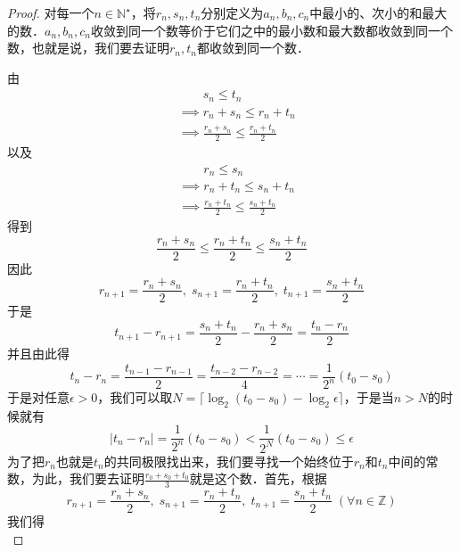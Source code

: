 \documentclass{ctexart}
\theoremstyle{definition}
\theoremstyle{definition}
\theoremstyle{plain}
\theoremstyle{plain}
\theoremstyle{plain}
\theoremstyle{definition}
\newcommand{\nat}{\mathbb{N}^\star}
\newcommand{\integer}{\mathbb{Z}}
\begin{document}
\begin{proof}
    对每一个$n \in \nat$，将$r_n,s_n,t_n$分别定义为$a_n,b_n,c_n$中最小的、次小的和最大的数．$a_n,b_n,c_n$收敛到同一个数等价于它们之中的最小数和最大数都收敛到同一个数，也就是说，我们要去证明$r_n,t_n$都收敛到同一个数．

\noindent 由
\begin{align}
    &\mathrel{\phantom{\implies}} s_n \leq t_n \\
    &\implies r_n + s_n \leq r_n + t_n \\
    &\implies \frac{r_n+s_n}{2} \leq \frac{r_n+t_n}{2} 
\end{align}
以及
\begin{align}
    &\mathrel{\phantom{\implies}} r_n \leq s_n \\
    &\implies r_n + t_n \leq s_n + t_n \\
    &\implies \frac{r_n+t_n}{2} \leq \frac{s_n+t_n}{2}
\end{align}
得到
\begin{equation}
    \frac{r_n+s_n}{2} \leq \frac{r_n+t_n}{2} \leq \frac{s_n+t_n}{2}
\end{equation}
因此
\begin{equation}
    r_{n+1} = \frac{r_n+s_n}{2}, \; s_{n+1} = \frac{r_n+t_n}{2}, \; t_{n+1}=\frac{s_n+t_n}{2}
\end{equation}
于是
\begin{equation}
    t_{n+1} - r_{n+1} = \frac{s_n+t_n}{2} - \frac{r_n+s_n}{2} = \frac{t_n - r_n}{2}
\end{equation}
\noindent 并且由此得
\begin{equation}
t_n - r_n = \frac{t_{n-1}-r_{n-1}}{2} = \frac{t_{n-2}-r_{n-2}}{4} = \cdots = \frac{1}{2^{n}}\left(t_0 - s_0\right)
\end{equation}
于是对任意$\epsilon > 0$，我们可以取$N = \lceil \log_2 \left(t_0-s_0\right) - \log_2 \epsilon \rceil$，于是当$n > N$的时候就有
\begin{equation}
    |t_n-r_n|=\frac{1}{2^n}(t_0-s_0) < \frac{1}{2^N}(t_0-s_0) \leq \epsilon
\end{equation}
为了把$r_n$也就是$t_n$的共同极限找出来，我们要寻找一个始终位于$r_n$和$t_n$中间的常数，为此，我们要去证明$\displaystyle\frac{r_0+s_0+t_0}{3}$就是这个数．首先，根据
\begin{equation}
    r_{n+1} = \frac{r_n+s_n}{2}, \; s_{n+1} = \frac{r_n+t_n}{2}, \; t_{n+1}=\frac{s_n+t_n}{2} \; (\forall n \in \integer)
\end{equation}
我们得
\begin{equation}

\end{equation}
\end{proof}
\end{document}
